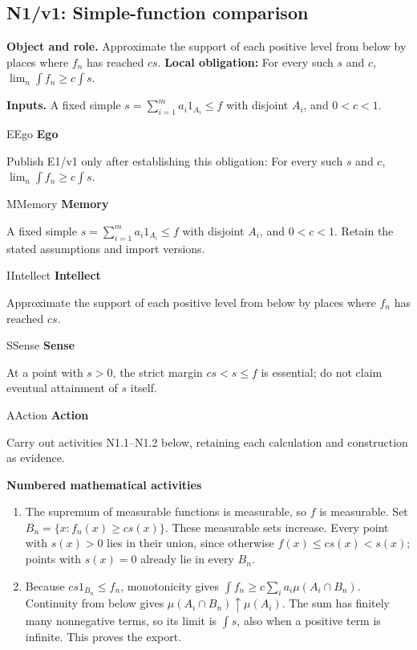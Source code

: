 \documentclass[preprint,12pt,aps,pra,showkeys,amsmath,amssymb,superscriptaddress,floatfix]{revtex4-2}
\theoremstyle{definition}
\theoremstyle{remark}
\newcommand{\mmfaculty}[3]{%
 \begin{mmfacultybox}{#1}{#2}
 {\sffamily\bfseries\color{MMBlue}#2}\par\smallskip #3
 \end{mmfacultybox}}
\newcommand{\field}[2]{\par\smallskip\noindent\textbf{#1.} #2\par}
\begin{document}
\subsection{N1/v1: Simple-function comparison}

\field{Object and role}{Approximate the support of each positive level from below by places
where \(f_n\) has reached \(cs\). \textbf{Local obligation:} For every
such \(s\) and \(c\), \(\lim_n\int f_n\ge c\int s\).}

\field{Inputs}{A fixed simple \(s=\sum_{i=1}^m a_i1_{A_i}\le f\) with disjoint \(A_i\),
and \(0<c<1\).}

\mmfaculty{E}{Ego}{Publish E1/v1 only after establishing this obligation: For every such
\(s\) and \(c\), \(\lim_n\int f_n\ge c\int s\).}

\mmfaculty{M}{Memory}{A fixed simple \(s=\sum_{i=1}^m a_i1_{A_i}\le f\) with disjoint \(A_i\),
and \(0<c<1\). Retain the stated assumptions and import versions.}

\mmfaculty{I}{Intellect}{Approximate the support of each positive level from below by places
where \(f_n\) has reached \(cs\).}

\mmfaculty{S}{Sense}{At a point with \(s>0\), the strict margin \(cs<s\le f\) is essential;
do not claim eventual attainment of \(s\) itself.}

\mmfaculty{A}{Action}{Carry out activities N1.1--N1.2 below, retaining each calculation and
construction as evidence.}

\smallskip\noindent\textbf{Numbered mathematical activities}

\begin{enumerate}[label=N1.\arabic*,leftmargin=3.4em]

\item The supremum of measurable functions is measurable, so \(f\) is
measurable. Set \(B_n=\{x:f_n(x)\ge c s(x)\}\). These measurable sets
increase. Every point with \(s(x)>0\) lies in their union, since
otherwise \(f(x)\le cs(x)<s(x)\); points with \(s(x)=0\) already lie in
every \(B_n\).

\item Because \(cs1_{B_n}\le f_n\), monotonicity gives
\(\int f_n\ge c\sum_i a_i\mu(A_i\cap B_n)\). Continuity from below gives
\(\mu(A_i\cap B_n)\uparrow\mu(A_i)\). The sum has finitely many
nonnegative terms, so its limit is \(\int s\), also when a positive term
is infinite. This proves the export.

\end{enumerate}
\end{document}
